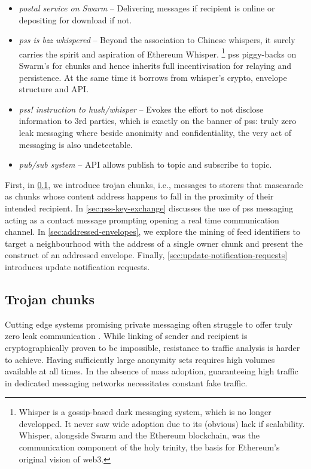 \begin{itemize}
\item \emph{postal service on Swarm} -- Delivering messages if recipient is online or depositing for download if not.
\item \emph{pss is bzz whispered} -- Beyond the association to Chinese whispers, it surely carries the spirit and aspiration of Ethereum Whisper.%
%
\footnote{Whisper is a gossip-based dark messaging system, which is no longer developped. It never saw wide adoption due to its (obvious) lack if  scalability. Whisper, alongside Swarm and the Ethereum blockchain, was the communication component of the holy trinity, the basis for Ethereum's original vision of web3.}
%
pss piggy-backs on Swarm's  for chunks and hence inherits full incentivisation for relaying and persistence. At the same time it borrows from whisper's crypto, envelope structure and API.
\item \emph{pss! instruction to hush/whisper} -- Evokes the effort to not disclose information to 3rd parties, which is exactly on the banner of pss: truly zero  leak messaging where beside anonimity and confidentiality, the very act of messaging is also undetectable.
\item  \emph{pub/sub system} -- API allows publish to topic and subscribe to topic.
\end{itemize}

First, in \ref{sec:trojan}, we introduce trojan chunks, i.e., messages to storers that mascarade as chunks whose content address happens to fall in the proximity of their intended recipient. 
In \ref{sec:pss-key-exchange} discusses the use of pss messaging acting as a contact message prompting opening a real time communication channel.          
In \ref{sec:addressed-envelopes}, we explore the mining of feed identifiers to target a neighbourhood with the address of a single owner chunk and present the construct of an addressed envelope. Finally,  \ref{sec:update-notification-requests} introduces update notification requests.

\subsection{Trojan chunks\statusgreen}\label{sec:trojan}

Cutting edge systems promising private messaging often struggle to offer truly zero leak communication \cite{kwon2016riffle}. While linking of sender and recipient is cryptographically proven to be impossible, resistance to traffic analysis is harder to achieve. Having sufficiently large anonymity sets requires high volumes available at all times. In the absence of mass adoption, guaranteeing high traffic in dedicated messaging networks necessitates constant fake traffic. 

